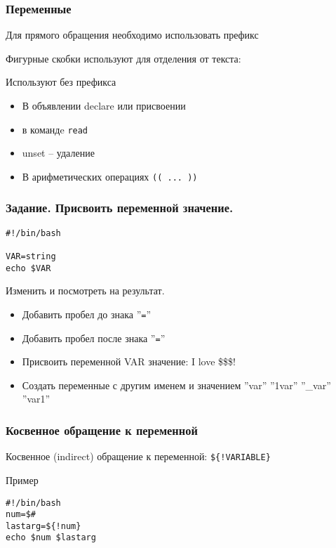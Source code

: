 

\begin{frame}
	\frametitle{Переменные} 
	\large{}

	Для прямого обращения необходимо использовать префикс \\
	\center{\Large{\tt \$}}

	Фигурные скобки используют для отделения от текста:\\

	
	\begin{alertblock}{Используют без префикса}
		\begin{itemize}
			\item В объявлении declare или присвоении
			\item в командe {\tt read}
			\item unset -- удаление
			\item В арифметических операциях {\tt (( ... ))}
		\end{itemize}
	\end{alertblock}
\end{frame}

\begin{frame}[fragile]
	\frametitle{Задание. Присвоить переменной значение.}

	\begin{lstlisting}
#!/bin/bash

VAR=string
echo $VAR
	\end{lstlisting}


	\begin{block}{Изменить и посмотреть на результат.}
		\begin{itemize}
			\item Добавить пробел до знака ''{\tt =}''
			\item Добавить пробел после знака ''{\tt =}''
			\item Присвоить переменной VAR значение: I love \$\$\$!
			\item Создать переменные с другим именем и значением ''var'' ''1var'' ''\_var'' ''var1''
		\end{itemize}
	\end{block}

\end{frame}

\begin{frame}[fragile]
	\frametitle{Косвенное обращение к переменной}

	Косвенное (indirect) обращение к переменной: {\tt \$\{!VARIABLE\}}

	\begin{block}{Пример}
		\begin{lstlisting}
#!/bin/bash 
num=$# 
lastarg=${!num} 
echo $num $lastarg
		\end{lstlisting}
	\end{block}

\end{frame}


